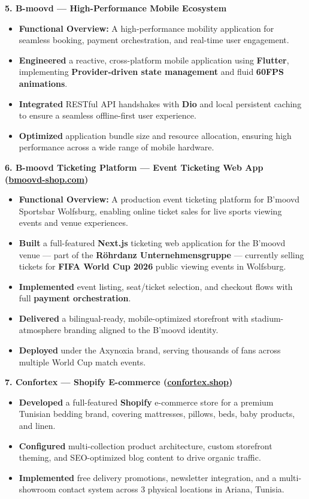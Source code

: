 \documentclass[10pt, letterpaper]{article}
\newenvironment{highlights}{
\begin{itemize}[leftmargin=12pt, itemsep=2pt]
}{
\end{itemize}
}
\begin{document}
\textbf{5. B-moovd --- High-Performance Mobile Ecosystem}
\begin{highlights}
\item \textbf{Functional Overview:} A high-performance mobility application for seamless booking, payment orchestration, and real-time user engagement.
\item \textbf{Engineered} a reactive, cross-platform mobile application using \textbf{Flutter}, implementing \textbf{Provider-driven state management} and fluid \textbf{60FPS animations}.
\item \textbf{Integrated} RESTful API handshakes with \textbf{Dio} and local persistent caching to ensure a seamless offline-first user experience.
\item \textbf{Optimized} application bundle size and resource allocation, ensuring high performance across a wide range of mobile hardware.
\end{highlights}

\textbf{6. B-moovd Ticketing Platform --- Event Ticketing Web App (\href{https://bmoovd-shop.com}{bmoovd-shop.com})}
\begin{highlights}
\item \textbf{Functional Overview:} A production event ticketing platform for B'moovd Sportsbar Wolfsburg, enabling online ticket sales for live sports viewing events and venue experiences.
\item \textbf{Built} a full-featured \textbf{Next.js} ticketing web application for the B'moovd venue --- part of the \textbf{R\"ohrdanz Unternehmensgruppe} --- currently selling tickets for \textbf{FIFA World Cup 2026} public viewing events in Wolfsburg.
\item \textbf{Implemented} event listing, seat/ticket selection, and checkout flows with full \textbf{payment orchestration}.
\item \textbf{Delivered} a bilingual-ready, mobile-optimized storefront with stadium-atmosphere branding aligned to the B'moovd identity.
\item \textbf{Deployed} under the Axynoxia brand, serving thousands of fans across multiple World Cup match events.
\end{highlights}

\textbf{7. Confortex --- Shopify E-commerce (\href{https://confortex.shop}{confortex.shop})}
\begin{highlights}
\item \textbf{Developed} a full-featured \textbf{Shopify} e-commerce store for a premium Tunisian bedding brand, covering mattresses, pillows, beds, baby products, and linen.
\item \textbf{Configured} multi-collection product architecture, custom storefront theming, and SEO-optimized blog content to drive organic traffic.
\item \textbf{Implemented} free delivery promotions, newsletter integration, and a multi-showroom contact system across 3 physical locations in Ariana, Tunisia.
\end{highlights}
\end{document}
